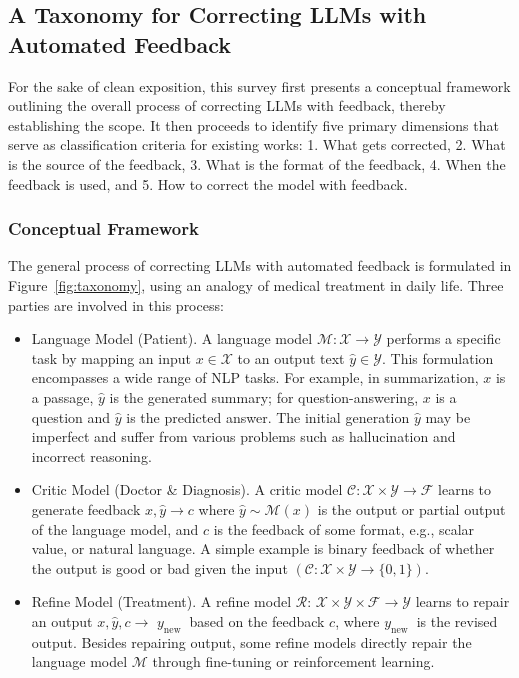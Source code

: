 \documentclass[12pt]{extarticle}
\begin{document}
\subsection{A Taxonomy for Correcting LLMs with Automated Feedback}
For the sake of clean exposition, this survey first presents a conceptual framework outlining the overall process of correcting LLMs with feedback, thereby establishing the scope. It then proceeds to identify five primary dimensions that serve as classification criteria for existing works: 1. What gets corrected, 2. What is the source of the feedback, 3. What is the format of the feedback, 4. When the feedback is used, and 5. How to correct the model with feedback.

\subsubsection{Conceptual Framework}
The general process of correcting LLMs with automated feedback is formulated in Figure~\ref{fig:taxonomy}, using an analogy of medical treatment in daily life. Three parties are involved in this process:

\begin{itemize}
    \item Language Model (Patient). A language model $\mathcal{M}: \mathcal{X} \rightarrow \mathcal{Y}$ performs a specific task by mapping an input $x \in \mathcal{X}$ to an output text $\hat{y} \in \mathcal{Y}$. This formulation encompasses a wide range of NLP tasks. For example, in summarization, $x$ is a passage, $\hat{y}$ is the generated summary; for question-answering, $x$ is a question and $\hat{y}$ is the predicted answer. The initial generation $\hat{y}$ may be imperfect and suffer from various problems such as hallucination and incorrect reasoning.

    \item Critic Model (Doctor \& Diagnosis). A critic model $\mathcal{C}: \mathcal{X} \times \mathcal{Y} \rightarrow \mathcal{F}$ learns to generate feedback $x, \hat{y} \rightarrow c$ where $\hat{y} \sim \mathcal{M}(x)$ is the output or partial output of the language model, and $c$ is the feedback of some format, e.g., scalar value, or natural language. A simple example is binary feedback of whether the output is good or bad given the input $(\mathcal{C}: \mathcal{X} \times \mathcal{Y} \rightarrow\{0,1\})$.

    \item Refine Model (Treatment). A refine model $\mathcal{R}$: $\mathcal{X} \times \mathcal{Y} \times \mathcal{F} \rightarrow \mathcal{Y}$ learns to repair an output $x, \hat{y}, c \rightarrow$ $y_{\text {new }}$ based on the feedback $c$, where $y_{\text {new }}$ is the revised output. Besides repairing output, some refine models directly repair the language model $\mathcal{M}$ through fine-tuning or reinforcement learning.
\end{itemize}
\end{document}
